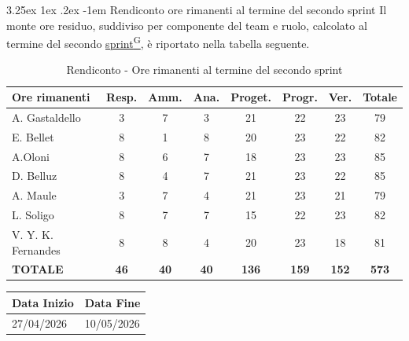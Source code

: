 \documentclass[a4paper,12pt]{article}
\makeatletter
\newcounter{subsubsubsection}[subsubsection]
\renewcommand\paragraph{\@startsection{paragraph}{5}{\z@}%
  {3.25ex \@plus1ex \@minus.2ex}%
  {-1em}%
  {\normalfont\normalsize\bfseries}}
\providecommand{\glslink}[2]{\href{https://alittlebyte-19.github.io/Documentazione/glossario.html\#gls-#1}{\underline{#2}\textsuperscript{\scriptsize G}}}
\makeatother
\begin{document}
\paragraph{Rendiconto ore rimanenti al termine del secondo sprint}
Il monte ore residuo, suddiviso per componente del team e ruolo, calcolato al termine del secondo \glslink{sprint}{sprint}, è riportato nella tabella seguente.
\begin{table}[htbp]
\centering
\renewcommand{\arraystretch}{1.5} 
\begin{tabularx}{\textwidth}{|X|c|c|c|c|c|c|c|}
\hline
\textbf{Ore rimanenti} & \textbf{Resp.} & \textbf{Amm.} & \textbf{Ana.} & \textbf{Proget.} & \textbf{Progr.} & \textbf{Ver.} & \textbf{Totale} \\
\hline
A. Gastaldello & 3 & 7 & 3 & 21 & 22 & 23 & 79 \\
\hline
E. Bellet & 8 & 1 & 8 & 20 & 23 & 22 & 82 \\
\hline
A.Oloni & 8 & 6 & 7 & 18 & 23 & 23 & 85 \\
\hline
D. Belluz & 8 & 4 & 7 & 21 & 23 & 22 & 85 \\
\hline
A. Maule & 3 & 7 & 4 & 21 & 23 & 21 & 79 \\
\hline
L. Soligo & 8 & 7 & 7 & 15 & 22 & 23 & 82 \\
\hline
V. Y. K. Fernandes & 8 & 8 & 4 & 20 & 23 & 18 & 81 \\
\hline
\rowcolor{gray!20}
\textbf{TOTALE} & \textbf{46} & \textbf{40} & \textbf{40} & \textbf{136} & \textbf{159} & \textbf{152} & \textbf{573} \\
\hline
\end{tabularx}
\caption{Rendiconto - Ore rimanenti al termine del secondo sprint}
\end{table}


\newpage

\label{sec:rtb_terzoperiodo}
\begin{table}[H]
    \centering
    \renewcommand{\arraystretch}{1.5} %
    \begin{tabularx}{\textwidth}{|X|X|}
    \hline \rowcolor{Dandelion!50}
    \textbf{Data Inizio} & \textbf{Data Fine}\\
    \hline
    27/04/2026 & 10/05/2026\\
    \hline

    \end{tabularx}
\end{table}
\end{document}
